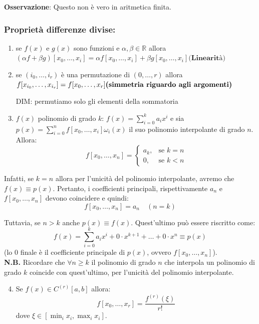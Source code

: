 \textbf{Osservazione}: Questo non è vero in aritmetica finita.


\subsubsection*{Proprietà differenze divise:}

\begin{enumerate}
    \item se $f(x)$ e $g(x)$ sono funzioni e $\alpha, \beta \in \mathbb{R}$ allora $(\alpha f + \beta g)[x_0, \dots, x_i] = \alpha f[x_0, \dots, x_i] + \beta g[x_0, \dots, x_i] \textbf{(Linearità)}$
    
    \item se $(i_0, \dots, i_r)$ è una permutazione di $(0, \dots, r)$ allora $f[x_{i_0}, \dots, x_{i_r}] = f[x_0, \dots, x_r] \\ \textbf{(simmetria riguardo agli argomenti)}$
    
    DIM: permutiamo solo gli elementi della sommatoria
    
    \item $f(x)$ polinomio di grado $k$: $f(x) = \sum_{i=0}^{k} a_i x^i$ e sia $p(x) = \sum_{i=0}^{n} f[x_0, \dots, x_i] \omega_i(x)$ il suo polinomio interpolante di grado $n$. Allora:
    $$f[x_0, \dots, x_n] = \begin{cases} 
    a_k, & \text{se } k=n \\ 
    0, & \text{se } k<n 
    \end{cases}$$
\end{enumerate}

Infatti, se $k=n$ allora per l'unicità del polinomio interpolante, avremo che $f(x) \equiv p(x)$. Pertanto, i coefficienti principali, rispettivamente $a_n$ e $f[x_0, \dots, x_n]$ devono coincidere e quindi:
$$f[x_0, \dots, x_n] = a_n \quad (n=k)$$

Tuttavia, se $n>k$ anche $p(x) \equiv f(x)$. Quest'ultimo può essere riscritto come:
$$f(x) = \sum_{i=0}^{k} a_i x^i + 0 \cdot x^{k+1} + \dots + 0 \cdot x^n \equiv p(x)$$ (lo 0 finale è il coefficiente principale di $p(x)$, ovvero $f[x_0, \dots, x_n]$).\\ 

\textbf{N.B.} Ricordare che $\forall n \ge k$ il polinomio di grado $n$ che interpola un polinomio di grado $k$ coincide con quest'ultimo, per l'unicità del polinomio interpolante.

\vspace{0.5cm}
\begin{enumerate}
    \setcounter{enumi}{3}
    \item Se $f(x) \in C^{(r)}[a,b]$ allora:
    $$f[x_0, \dots, x_r] = \frac{f^{(r)}(\xi)}{r!}$$
    dove $\xi \in [\min_i x_i, \max_i x_i]$.
\end{enumerate}


